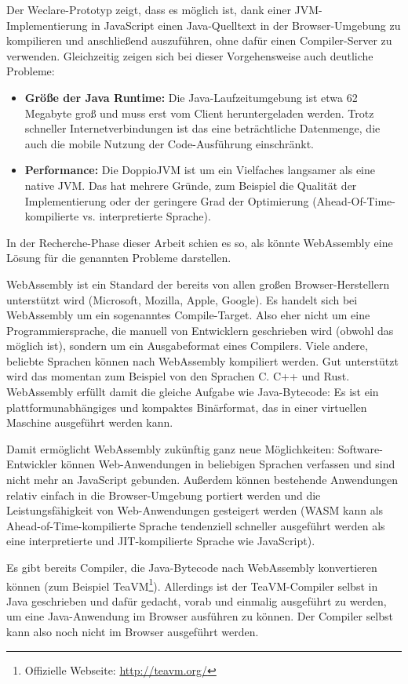 Der Weclare-Prototyp zeigt, dass es möglich ist, dank einer JVM-Implementierung in JavaScript einen Java-Quelltext in der Browser-Umgebung zu kompilieren und anschließend auszuführen, ohne dafür einen Compiler-Server zu verwenden. Gleichzeitig zeigen sich bei dieser Vorgehensweise auch deutliche Probleme:

\begin{itemize}
    \item \textbf{Größe der Java Runtime:} Die Java-Laufzeitumgebung ist etwa 62 Megabyte groß und muss erst vom Client heruntergeladen werden. Trotz schneller Internetverbindungen ist das eine beträchtliche Datenmenge, die auch die mobile Nutzung der Code-Ausführung einschränkt.
    \item \textbf{Performance:} Die DoppioJVM ist um ein Vielfaches langsamer als eine native JVM. Das hat mehrere Gründe, zum Beispiel die Qualität der Implementierung oder der geringere Grad der Optimierung (Ahead-Of-Time-kompilierte vs. interpretierte Sprache).
\end{itemize}

In der Recherche-Phase dieser Arbeit schien es so, als könnte WebAssembly eine Lösung für die genannten Probleme darstellen.

WebAssembly ist ein Standard der bereits von allen großen Browser-Herstellern unterstützt wird (Microsoft, Mozilla, Apple, Google). Es handelt sich bei WebAssembly um ein sogenanntes Compile-Target. Also eher nicht um eine Programmiersprache, die manuell von Entwicklern geschrieben wird (obwohl das möglich ist), sondern um ein Ausgabeformat eines Compilers. Viele andere, beliebte Sprachen können nach WebAssembly kompiliert werden. Gut unterstützt wird das momentan zum Beispiel von den Sprachen C. C++ und Rust. WebAssembly erfüllt damit die gleiche Aufgabe wie Java-Bytecode: Es ist ein plattformunabhängiges und kompaktes Binärformat, das in einer virtuellen Maschine ausgeführt werden kann.

Damit ermöglicht WebAssembly zukünftig ganz neue Möglichkeiten: Software-Entwickler können Web-Anwendungen in beliebigen Sprachen verfassen und sind nicht mehr an JavaScript gebunden. Außerdem können bestehende Anwendungen relativ einfach in die Browser-Umgebung portiert werden und die Leistungsfähigkeit von Web-Anwendungen gesteigert werden (WASM kann als Ahead-of-Time-kompilierte Sprache tendenziell schneller ausgeführt werden als eine interpretierte und JIT-kompilierte Sprache wie JavaScript).

Es gibt bereits Compiler, die Java-Bytecode nach WebAssembly konvertieren können (zum Beispiel TeaVM\footnote{Offizielle Webseite: \url{http://teavm.org/}}). Allerdings ist der TeaVM-Compiler selbst in Java geschrieben und dafür gedacht, vorab und einmalig ausgeführt zu werden, um eine Java-Anwendung im Browser ausführen zu können. Der Compiler selbst kann also noch nicht im Browser ausgeführt werden.

